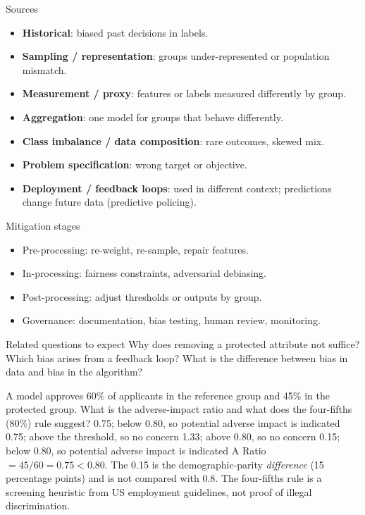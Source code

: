 {\begin{block}{Sources}
		\begin{itemize}
			\item \textbf{Historical}: biased past decisions in labels.
			\item \textbf{Sampling / representation}: groups under-represented or population mismatch.
			\item \textbf{Measurement / proxy}: features or labels measured differently by group.
			\item \textbf{Aggregation}: one model for groups that behave differently.
			\item \textbf{Class imbalance / data composition}: rare outcomes, skewed mix.
			\item \textbf{Problem specification}: wrong target or objective.
			\item \textbf{Deployment / feedback loops}: used in different context; predictions change future data (predictive policing).
\end{itemize}\end{block}}
{\begin{block}{Mitigation stages}
		\begin{itemize}
			\item Pre-processing: re-weight, re-sample, repair features.
			\item In-processing: fairness constraints, adversarial debiasing.
			\item Post-processing: adjust thresholds or outputs by group.
			\item Governance: documentation, bias testing, human review, monitoring.
	\end{itemize}\end{block}
	\begin{alertblock}{Related questions to expect}
		Why does removing a protected attribute not suffice? Which bias arises from a feedback loop? What is the difference between bias in data and bias in the algorithm?
\end{alertblock}}

{A model approves 60\% of applicants in the reference group and 45\% in the protected group. What is the adverse-impact ratio and what does the four-fifths (80\%) rule suggest?}
{0.75; below 0.80, so potential adverse impact is indicated}
{0.75; above the threshold, so no concern}
{1.33; above 0.80, so no concern}
{0.15; below 0.80, so potential adverse impact is indicated}
{A}
{Ratio $=45/60=0.75<0.80$. The 0.15 is the demographic-parity \emph{difference} (15 percentage points) and is not compared with 0.8. The four-fifths rule is a screening heuristic from US employment guidelines, not proof of illegal discrimination.}

